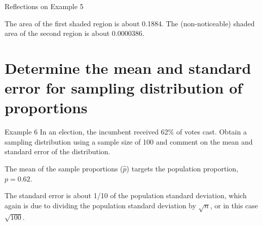 \documentclass[t]{beamer}
\begin{document}
\begin{frame}{Reflections on Example 5}
\begin{minipage}{0.45\textwidth}
\end{minipage}
\hspace{0.25cm}
\begin{minipage}{0.45\textwidth}
\end{minipage}	\smallskip
The area of the first shaded region is about 0.1884. The (non-noticeable) shaded area of the second region is about 0.0000386.
\end{frame}


\section{Determine the mean and standard error for sampling distribution of proportions}

\begin{frame}{Example 6}
In an election, the incumbent received 62\% of votes cast. Obtain a sampling distribution using a sample size of 100 and comment on the mean and standard error of the distribution.	\newline\\	\pause

The mean of the sample proportions ($\hat{p}$) targets the population proportion, $p = 0.62$.	\newline\\	\pause

The standard error is about 1/10 of the population standard deviation, which again is due to dividing the population standard deviation by $\sqrt{n}$, or in this case $\sqrt{100}$.
\end{frame}
\end{document}
